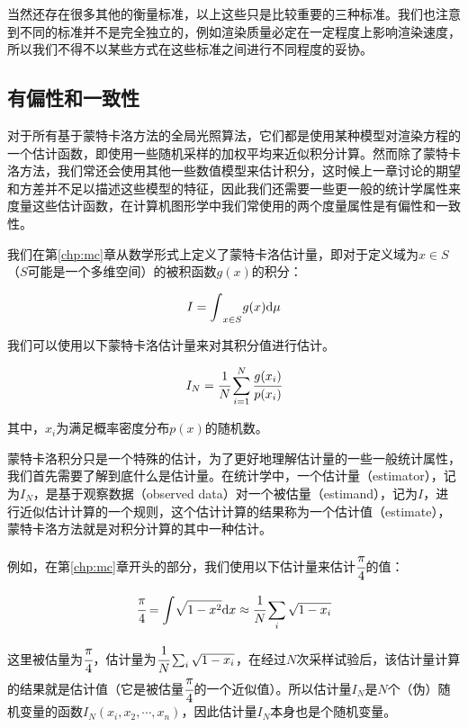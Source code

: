当然还存在很多其他的衡量标准，以上这些只是比较重要的三种标准。我们也注意到不同的标准并不是完全独立的，例如渲染质量必定在一定程度上影响渲染速度，所以我们不得不以某些方式在这些标准之间进行不同程度的妥协。






\subsection{有偏性和一致性}\label{sec:pt-bias-consistency}
对于所有基于蒙特卡洛方法的全局光照算法，它们都是使用某种模型对渲染方程的一个估计函数，即使用一些随机采样的加权平均来近似积分计算。然而除了蒙特卡洛方法，我们常还会使用其他一些数值模型来估计积分，这时候上一章讨论的期望和方差并不足以描述这些模型的特征，因此我们还需要一些更一般的统计学属性来度量这些估计函数，在计算机图形学中我们常使用的两个度量属性是有偏性和一致性。

我们在第\ref{chp:mc}章从数学形式上定义了蒙特卡洛估计量，即对于定义域为$x\in S$（$S$可能是一个多维空间）的被积函数$g(x)$的积分：

\begin{equation}
	I={\rm \int}_{x\in S}g(x){\rm d}\mu
\end{equation}

\noindent 我们可以使用以下蒙特卡洛估计量来对其积分值进行估计。

\begin{equation}
	I_N= \cfrac{1}{N}\sum^{N}_{i=1} \cfrac{g(x_i)}{p(x_i)}
\end{equation}

\noindent 其中，$x_i$为满足概率密度分布$p(x)$的随机数。

蒙特卡洛积分只是一个特殊的估计，为了更好地理解估计量的一些一般统计属性，我们首先需要了解到底什么是估计量。在统计学中，一个估计量（estimator），记为$I_N$，是基于观察数据（observed data）对一个被估量（estimand），记为$I$，进行近似估计计算的一个规则，这个估计计算的结果称为一个估计值（estimate），蒙特卡洛方法就是对积分计算的其中一种估计。

例如，在第\ref{chp:mc}章开头的部分，我们使用以下估计量来估计$ \cfrac{\pi}{4}$的值：

\begin{equation}
	 \cfrac{\pi}{4}={\rm \int}\sqrt{1-x^2}{\rm d}x\approx \cfrac{1}{N}\sum_{i}\sqrt{1-x_i}
\end{equation}

这里被估量为$ \cfrac{\pi}{4}$，估计量为$ \cfrac{1}{N}\sum_{i}\sqrt{1-x_i}$，在经过$N$次采样试验后，该估计量计算的结果就是估计值（它是被估量$ \cfrac{\pi}{4}$的一个近似值）。所以估计量$I_N$是$N$个（伪）随机变量的函数$I_N(x_i,x_2,\cdots,x_n)$，因此估计量$I_N$本身也是个随机变量。

